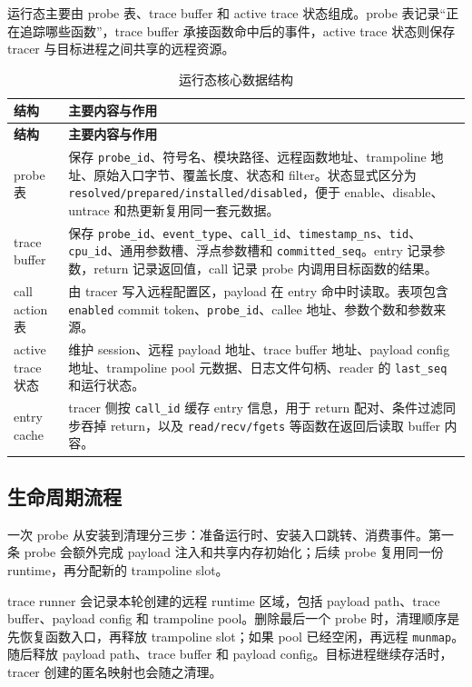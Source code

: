 \documentclass[UTF8,a4paper,11pt,fontset=fandol]{ctexart}
\newcommand{\code}[1]{\texttt{#1}}
\begin{document}
运行态主要由 probe 表、trace buffer 和 active trace 状态组成。probe 表记录“正在追踪哪些函数”，trace buffer 承接函数命中后的事件，active trace 状态则保存 tracer 与目标进程之间共享的远程资源。

\begin{longtable}{@{}P{3.3cm}P{12.25cm}@{}}
\caption{运行态核心数据结构}\label{tab:runtime-state}\\
\toprule
\textbf{结构} & \textbf{主要内容与作用}\\
\midrule
\endfirsthead
\toprule
\textbf{结构} & \textbf{主要内容与作用}\\
\midrule
\endhead
probe 表 & 保存 \code{probe\_id}、符号名、模块路径、远程函数地址、trampoline 地址、原始入口字节、覆盖长度、状态和 filter。状态显式区分为 \code{resolved/prepared/installed/disabled}，便于 enable、disable、untrace 和热更新复用同一套元数据。\\
trace buffer & 保存 \code{probe\_id}、\code{event\_type}、\code{call\_id}、\code{timestamp\_ns}、\code{tid}、\code{cpu\_id}、通用参数槽、浮点参数槽和 \code{committed\_seq}。entry 记录参数，return 记录返回值，call 记录 probe 内调用目标函数的结果。\\
call action 表 & 由 tracer 写入远程配置区，payload 在 entry 命中时读取。表项包含 \code{enabled} commit token、\code{probe\_id}、callee 地址、参数个数和参数来源。\\
active trace 状态 & 维护 session、远程 payload 地址、trace buffer 地址、payload config 地址、trampoline pool 元数据、日志文件句柄、reader 的 \code{last\_seq} 和运行状态。\\
entry cache & tracer 侧按 \code{call\_id} 缓存 entry 信息，用于 return 配对、条件过滤同步吞掉 return，以及 \code{read/recv/fgets} 等函数在返回后读取 buffer 内容。\\
\bottomrule
\end{longtable}

\subsection{生命周期流程}

一次 probe 从安装到清理分三步：准备运行时、安装入口跳转、消费事件。第一条 probe 会额外完成 payload 注入和共享内存初始化；后续 probe 复用同一份 runtime，再分配新的 trampoline slot。

trace runner 会记录本轮创建的远程 runtime 区域，包括 payload path、trace buffer、payload config 和 trampoline pool。删除最后一个 probe 时，清理顺序是先恢复函数入口，再释放 trampoline slot；如果 pool 已经空闲，再远程 \code{munmap}。随后释放 payload path、trace buffer 和 payload config。目标进程继续存活时，tracer 创建的匿名映射也会随之清理。
\end{document}
